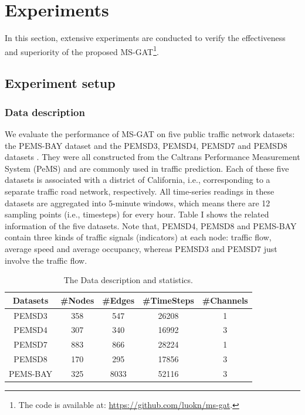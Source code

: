 \section{Experiments}
\label{sec:experiments}
In this section, extensive experiments are conducted to verify the effectiveness and superiority of the proposed MS-GAT\footnote{The code is available at: \url{https://github.com/luokn/ms-gat}.}.

\subsection{Experiment setup}
\subsubsection{Data description}
We evaluate the performance of MS-GAT on five public traffic network datasets: the PEMS-BAY dataset  \cite{li2017diffusion} and the PEMSD3, PEMSD4, PEMSD7 and PEMSD8 datasets  \cite{song2020spatial}. They were all constructed from the Caltrans Performance Measurement System (PeMS) \cite{chen2001freeway} and are commonly used in traffic prediction. Each of these five datasets is associated with a district of California, i.e., corresponding to a separate traffic road network, respectively. All time-series readings in these datasets are aggregated into 5-minute windows, which means there are 12 sampling points (i.e., timesteps) for every hour. Table I shows the related information of the five datasets. Note that, PEMSD4, PEMSD8 and PEMS-BAY contain three kinds of traffic signals (indicators) at each node: traffic flow, average speed and average occupancy, whereas PEMSD3 and PEMSD7 just involve the traffic flow.

\begin{table}[!htb]
    \caption{The Data description and statistics.}
    \label{tab:datasets}
    \centering
    \begin{tabular}{ccccc}
        \toprule[2pt]
        Datasets & \#Nodes & \#Edges & \#TimeSteps & \#Channels \\
        \hline
        PEMSD3   & 358     & 547     & 26208       & 1          \\
        PEMSD4   & 307     & 340     & 16992       & 3          \\
        PEMSD7   & 883     & 866     & 28224       & 1          \\
        PEMSD8   & 170     & 295     & 17856       & 3          \\
        PEMS-BAY & 325     & 8033    & 52116       & 3          \\
        \bottomrule[2pt]
    \end{tabular}
\end{table}

